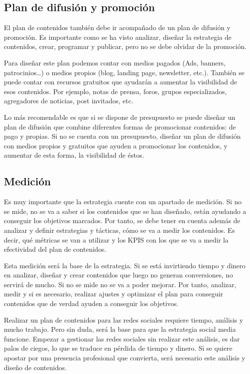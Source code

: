 \subsection{Plan de difusión y promoción}

El plan de contenidos también debe ir acompañado de un plan de difusión y promoción. Es importante como se ha visto analizar, diseñar la estrategia de contenidos, crear, programar y publicar, pero no se debe olvidar de la promoción.

Para diseñar este plan podemos contar con medios pagados (Ads, banners, patrocinios…)  o medios propios (blog, landing page, newsletter, etc.). También se puede contar con recursos gratuitos que ayudarán a aumentar la visibilidad de esos contenidos. Por ejemplo, notas de prensa, foros, grupos especializados, agregadores de noticias, post invitados, etc.

Lo más recomendable es que si se dispone de presupuesto se puede diseñar un plan de difusión que combine diferentes formas de promocionar contenidos: de pago y propias. Si no se cuenta con un presupuesto, diseñar un plan de difusión con medios propios y gratuitos que ayuden a promocionar los contenidos, y aumentar de esta forma, la visibilidad de éstos.

\subsection{Medición}

Es muy  importante que la estrategia cuente con un apartado de medición. Si no se mide, no se va a saber si los contenidos que se han diseñado, están ayudando a conseguir los objetivos marcados. Por tanto, se debe tener en cuenta además de analizar y definir estrategias y tácticas, cómo se va a medir los contenidos. Es decir, qué métricas se van a utilizar y los KPIS con los que se va a medir la efectividad del plan de contenidos.

Esta medición será la base de la estrategia. Si se está invirtiendo tiempo y dinero en analizar, diseñar y crear contenidos que luego no generan conversiones, no servirá de mucho. Si no se mide no se va a poder mejorar. Por tanto, analizar, medir y si es necesario, realizar ajustes y optimizar el plan para conseguir contenidos que de verdad ayuden a conseguir los objetivos. 

Realizar un plan de contenidos para las redes sociales requiere tiempo, análisis y mucho trabajo. Pero sin duda, será la base para que la estrategia social media funcione. Empezar a gestionar las redes sociales sin realizar este análisis, es dar palos de ciegos, lo que se traduce en pérdida de tiempo y dinero. Si se quiere apostar por una presencia profesional que convierta, será necesario este análisis y diseño de contenidos. 


